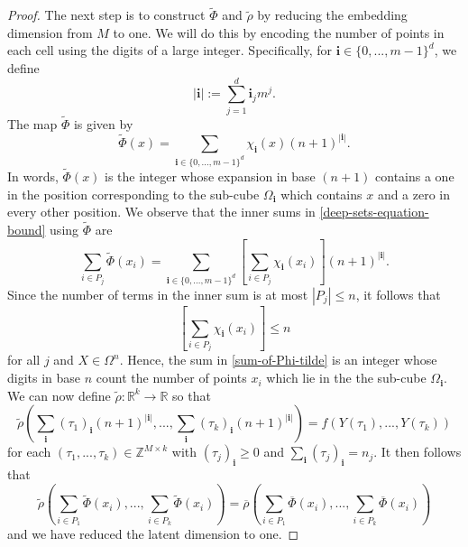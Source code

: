 \documentclass[twoside,11pt]{article}
\begin{document}
\begin{proof}
The next step is to construct $\widetilde{\Phi}$ and $\widetilde{\rho}$ by reducing the embedding dimension from $M$ to one. We will do this by encoding the number of points in each cell using the digits of a large integer. Specifically, for $\textbf{i}\in \{0,...,m-1\}^d$, we define
\begin{equation}
    |\textbf{i}| := \sum_{j=1}^d \textbf{i}_jm^j.
\end{equation}
The map $\widetilde{\Phi}$ is given by
\begin{equation}\label{digit-encoding-equation}
    \widetilde{\Phi}(x) = \sum_{\textbf{i}\in \{0,...,m-1\}^d} \chi_{\textbf{i}}(x)(n+1)^{|\textbf{i}|}.
\end{equation}
In words, $\widetilde{\Phi}(x)$ is the integer whose expansion in base $(n+1)$ contains a one in the position corresponding to the sub-cube $\Omega_\textbf{i}$ which contains $x$ and a zero in every other position. We observe that the inner sums in \eqref{deep-sets-equation-bound} using $\widetilde{\Phi}$ are
\begin{equation}\label{sum-of-Phi-tilde}
    \sum_{i\in P_j}\widetilde\Phi(x_i) = \sum_{\textbf{i}\in \{0,...,m-1\}^d} \left[\sum_{i\in P_j}\chi_{\textbf{i}}(x_i)\right](n+1)^{|\textbf{i}|}.
\end{equation}
Since the number of terms in the inner sum is at most $|P_j| \leq n$, it follows that
\begin{equation}
    \left[\sum_{i\in P_j}\chi_{\textbf{i}}(x_i)\right] \leq n
\end{equation}
for all $j$ and $X\in \Omega^n$. Hence, the sum in \eqref{sum-of-Phi-tilde} is an integer whose digits in base $n$ count the number of points $x_i$ which lie in the the sub-cube $\Omega_\textbf{i}$. We can now define $\widetilde{\rho}:\mathbb{R}^k\rightarrow \mathbb{R}$ so that
\begin{equation}
    \widetilde{\rho}\left(\sum_{\textbf{i}}(\tau_1)_\textbf{i}(n+1)^{|\textbf{i}|},...,\sum_{\textbf{i}}(\tau_k)_\textbf{i}(n+1)^{|\textbf{i}|}\right) = f(Y(\tau_1),...,Y(\tau_k))
\end{equation}
for each $(\tau_1,...,\tau_k)\in \mathbb{Z}^{M\times k}$ with $(\tau_j)_{\textbf{i}} \geq 0$ and $\sum_{\textbf{i}} (\tau_j)_\textbf{i} = n_j$. It then follows that
\begin{equation}
    \widetilde{\rho}\left(\sum_{i\in P_1}\widetilde{\Phi}(x_i),...,\sum_{i\in P_k}\widetilde{\Phi}(x_i)\right) = \overline{\rho}\left(\sum_{i\in P_1}\overline{\Phi}(x_i),...,\sum_{i\in P_k}\overline{\Phi}(x_i)\right)
\end{equation}
and we have reduced the latent dimension to one.


\end{proof}
\end{document}
